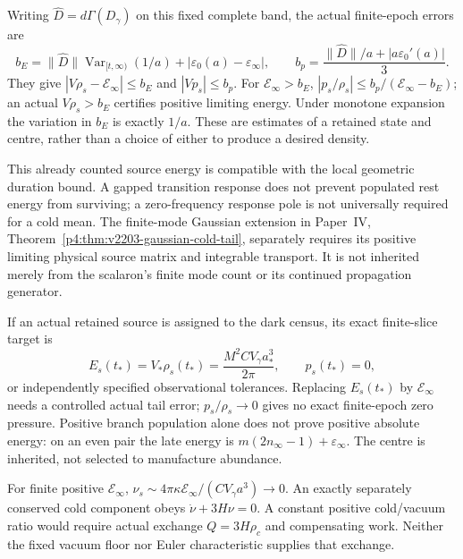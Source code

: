 \documentclass[12pt,a4paper]{article}
\begin{document}
Writing $\widehat D=d\Gamma(D_\gamma)$ on this fixed complete band,
the actual finite-epoch errors are
\[
 b_E=\|\widehat D\|\operatorname{Var}_{[t,\infty)}(1/a)
               +|\varepsilon_0(a)-\varepsilon_\infty|,
 \qquad
 b_p=\frac{\|\widehat D\|/a+|a\varepsilon_0'(a)|}{3}.
\]
They give $|V\rho_s-\mathcal E_\infty|\le b_E$ and
$|Vp_s|\le b_p$.  For $\mathcal E_\infty>b_E$,
$|p_s/\rho_s|\le b_p/(\mathcal E_\infty-b_E)$; an actual
$V\rho_s>b_E$ certifies positive limiting energy.  Under monotone
expansion the variation in $b_E$ is exactly $1/a$.
These are estimates of a retained state and centre, rather than a choice
of either to produce a desired density.

This already counted source energy is compatible with the local geometric
duration bound. A gapped transition response does not prevent populated
rest energy from surviving; a zero-frequency response pole is not
universally required for a cold mean.
The finite-mode Gaussian extension in Paper~IV,
Theorem~\ref{p4:thm:v2203-gaussian-cold-tail}, separately requires its positive
limiting physical source matrix and integrable transport. It is not
inherited merely from the scalaron's finite mode count or its continued
propagation generator.

\begin{remark}
\label{p8:rem:v2203-finite-epoch-cold-target}
If an actual retained source is assigned to the dark census, its exact
finite-slice target is
\[
 E_s(t_*)=V_*\rho_s(t_*)=\frac{M^2CV_\gamma a_*^3}{2\pi},
 \qquad p_s(t_*)=0,
\]
or independently specified observational tolerances.
Replacing $E_s(t_*)$ by $\mathcal E_\infty$ needs a controlled actual
tail error; $p_s/\rho_s\to0$ gives no exact finite-epoch zero pressure.
Positive branch population alone does not prove positive absolute energy:
on an even pair the late energy is
$m(2n_\infty-1)+\varepsilon_\infty$.
The centre is inherited, not selected to manufacture abundance.

For finite positive $\mathcal E_\infty$,
$\nu_s\sim4\pi\kappa\mathcal E_\infty/(CV_\gamma a^3)\to0$.
An exactly separately conserved cold component obeys $\dot\nu+3H\nu=0$.
A constant positive cold/vacuum ratio would require actual exchange
$Q=3H\rho_c$ and compensating work. Neither the fixed vacuum floor
nor Euler characteristic supplies that exchange.
\end{remark}
\end{document}
